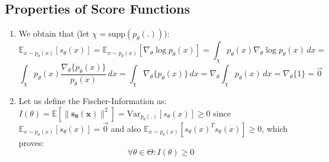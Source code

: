 \documentclass{article}
\begin{document}
\subsection{Properties of Score Functions}
\begin{enumerate}
\item 
We obtain that (let $\chi = \text{supp}( p_\theta(.))$):
\begin{equation*}
    \mathbb{E}_{x \sim p_\theta(x)} [s_\theta(x)] = \mathbb{E}_{x \sim p_\theta(x)} [ \nabla_\theta \log p_\theta(x)] = 
    \int_\chi p_\theta(x) \nabla_\theta \log p_\theta(x) \, dx = 
\end{equation*}
\begin{equation*}
    \int_\chi p_\theta(x) \frac{\nabla_\theta \{p_\theta(x)\}} {p_\theta(x)} \, dx = \int_\chi \nabla_\theta \{p_\theta(x)\} \, dx = 
    \nabla_\theta{\int_\chi p_\theta(x) \, dx} = \nabla_\theta \{1\} = \vec{0}
\end{equation*}
\item Let us define the Fischer-Information as: $I(\theta) = \mathbb{E} [ \| \mathbf{s_\theta(x)} \|^2 ] = \text{Var}_{p_\theta(.)}[s_\theta(x)] \geq 0$ since $ \mathbb{E}_{x \sim p_\theta(x)} [s_\theta(x)]=\vec{0}$ and also $\mathbb{E}_{x \sim p_\theta(x)} [s_\theta(x)^T s_\theta(x)] \geq 0$, which proves:
\begin{equation*}
    \forall \theta \in \Theta: I(\theta) \geq 0
\end{equation*}
\end{enumerate}
\end{document}

